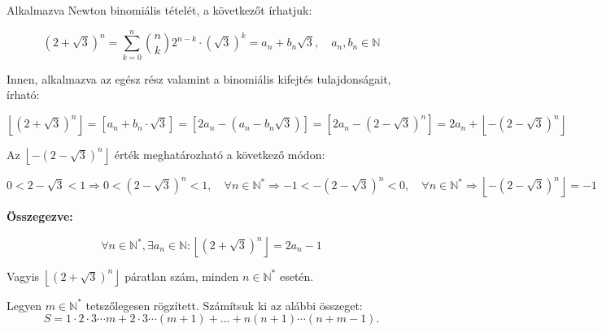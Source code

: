 \begin{solution}
Alkalmazva Newton binomiális tételét, a következőt írhatjuk:

\[
(2+\sqrt{3})^{n}=\sum_{k=0}^{n}\binom{n}{k}2^{n-k}\cdot(\sqrt{3})^{k}=a_{n}+b_{n}\sqrt{3},\quad a_{n},b_{n}\in\mathbb{N}
\]

Innen, alkalmazva az egész rész valamint a binomiális kifejtés tulajdonságait,
írható:

\[
\left\lfloor (2+\sqrt{3})^{n}\right\rfloor =[a_{n}+b_{n}\cdot\sqrt{3}]=[2a_{n}-(a_{n}-b_{n}\sqrt{3})]=[2a_{n}-(2-\sqrt{3})^{n}]=2a_{n}+\left\lfloor -(2-\sqrt{3})^{n}\right\rfloor 
\]

Az $\left\lfloor -(2-\sqrt{3})^{n}\right\rfloor $ érték meghatározható
a következő módon:

\[
0<2-\sqrt{3}<1\Rightarrow0<(2-\sqrt{3})^{n}<1,\quad\forall n\in\mathbb{N}^{*}\Rightarrow-1<-(2-\sqrt{3})^{n}<0,\quad\forall n\in\mathbb{N}^{*}\Rightarrow\left\lfloor -(2-\sqrt{3})^{n}\right\rfloor =-1
\]

\bigskip{}

\textbf{Összegezve:}

\[
\forall n\in\mathbb{N}^{*},\exists a_{n}\in\mathbb{N}:\left\lfloor (2+\sqrt{3})^{n}\right\rfloor =2a_{n}-1
\]

Vagyis $\left\lfloor (2+\sqrt{3})^{n}\right\rfloor $ páratlan szám,
minden $n\in\mathbb{N}^{*}$ esetén.
\end{solution}
\begin{extraproblem}
Legyen $m\in\mathbb{N}^{*}$ tetszőlegesen rögzített. Számítsuk ki
az alábbi összeget:
\[
S=1\cdot2\cdot3\cdots m+2\cdot3\cdots(m+1)+\ldots+n(n+1)\cdots(n+m-1).
\]
\end{extraproblem}
